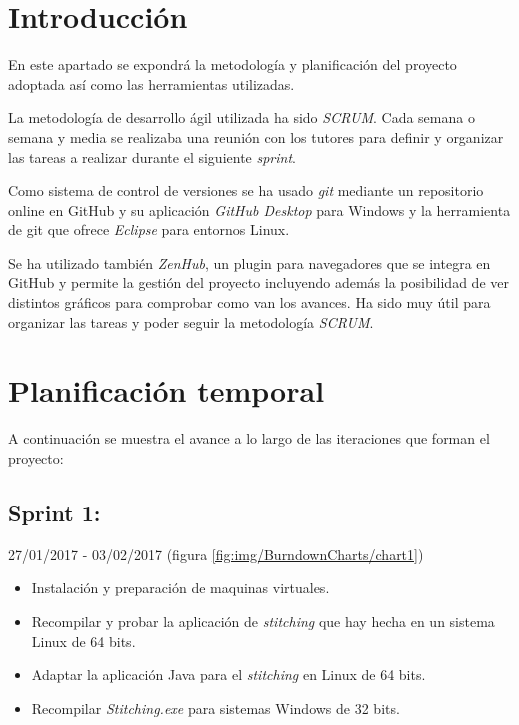 
\section{Introducción}
En este apartado se expondrá la metodología y planificación del proyecto adoptada así como las herramientas utilizadas.

La metodología de desarrollo ágil utilizada ha sido \emph{SCRUM}. Cada semana o semana y media se realizaba una reunión con los tutores para definir y organizar las tareas a realizar durante el siguiente \textit{sprint}.

Como sistema de control de versiones se ha usado \emph{git} mediante un repositorio online en GitHub y su aplicación \emph{GitHub Desktop} para Windows y la herramienta de git que ofrece \emph{Eclipse} para entornos Linux.

Se ha utilizado también \emph{ZenHub}, un plugin para navegadores que se integra en GitHub y permite la gestión del proyecto incluyendo además la posibilidad de ver distintos gráficos para comprobar como van los avances. Ha sido muy útil para organizar las tareas y poder seguir la metodología \emph{SCRUM}.

\newpage

\section{Planificación temporal}
A continuación se muestra el avance a lo largo de las iteraciones que forman el proyecto:

\subsection{Sprint 1: }
27/01/2017 - 03/02/2017 (figura \ref{fig:img/BurndownCharts/chart1})


\begin{itemize}
    \item Instalación y preparación de maquinas virtuales.
    \item Recompilar y probar la aplicación de \textit{stitching} que hay hecha en un sistema Linux de 64 bits.
    \item Adaptar la aplicación Java para el \textit{stitching} en Linux de 64 bits.
    \item Recompilar \textit{Stitching.exe} para sistemas Windows de 32 bits.
\end{itemize}

